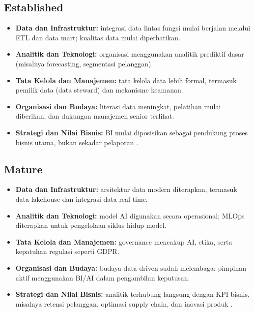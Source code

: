 \subsection{Established}
\begin{itemize}
	\item \textbf{Data dan Infrastruktur:} integrasi data lintas fungsi mulai berjalan melalui ETL dan data mart; kualitas data mulai diperhatikan.
	\item \textbf{Analitik dan Teknologi:} organisasi menggunakan analitik prediktif dasar (misalnya forecasting, segmentasi pelanggan).
	\item \textbf{Tata Kelola dan Manajemen:} tata kelola data lebih formal, termasuk pemilik data (data steward) dan mekanisme keamanan.
	\item \textbf{Organisasi dan Budaya:} literasi data meningkat, pelatihan mulai diberikan, dan dukungan manajemen senior terlihat.
	\item \textbf{Strategi dan Nilai Bisnis:} BI mulai diposisikan sebagai pendukung proses bisnis utama, bukan sekadar pelaporan \cite{yeoh2008biimplement, islam2017success}.
\end{itemize}

\subsection{Mature}
\begin{itemize}
	\item \textbf{Data dan Infrastruktur:} arsitektur data modern diterapkan, termasuk data lakehouse dan integrasi data real-time.
	\item \textbf{Analitik dan Teknologi:} model AI digunakan secara operasional; MLOps diterapkan untuk pengelolaan siklus hidup model.
	\item \textbf{Tata Kelola dan Manajemen:} governance mencakup AI, etika, serta kepatuhan regulasi seperti GDPR.
	\item \textbf{Organisasi dan Budaya:} budaya data-driven sudah melembaga; pimpinan aktif menggunakan BI/AI dalam pengambilan keputusan.
	\item \textbf{Strategi dan Nilai Bisnis:} analitik terhubung langsung dengan KPI bisnis, misalnya retensi pelanggan, optimasi supply chain, dan inovasi produk \cite{liao2021business, lim2023adoption}.
\end{itemize}

